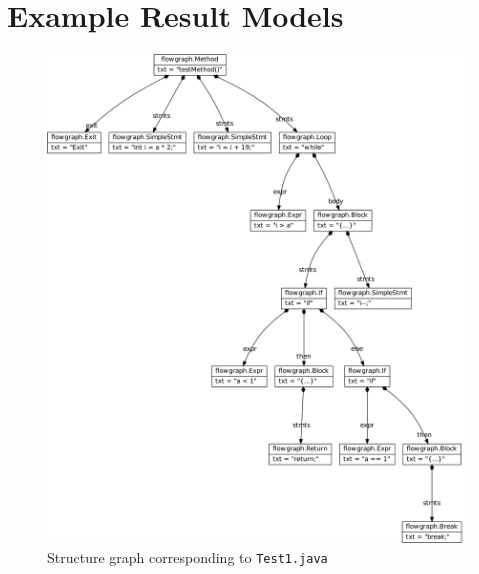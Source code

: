 \documentclass[10pt]{article}
\begin{document}
\clearpage
\section{Example Result Models}
\label{sec:result-models}

\begin{figure}[h!]
  \centering
  \includegraphics[width=\linewidth]{../results/Test1-StructureGraph}
  \caption{Structure graph corresponding to \texttt{Test1.java}}
  \label{fig:sg-test1}
\end{figure}
\end{document}
